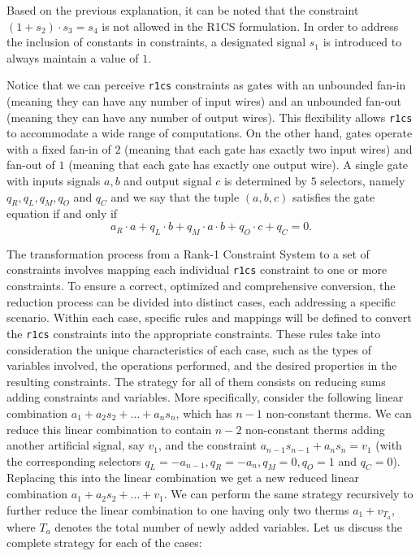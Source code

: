 Based on the previous explanation, it can be noted that the constraint $(1 + s_2) \cdot s_3 = s_4$ is not allowed in the R1CS formulation. In order to address the inclusion of constants in constraints, a designated signal $s_1$ is introduced to always maintain a value of $1$.

Notice that we can perceive \texttt{r1cs} constraints as gates with an unbounded fan-in (meaning they can have any number of input wires) and an unbounded fan-out (meaning they can have any number of output wires). This flexibility allows \texttt{r1cs} to accommodate a wide range of computations. On the other hand, \plonk gates operate with a fixed fan-in of $2$ (meaning that each gate has exactly two input wires) and fan-out of $1$ (meaning that each gate has exactly one output wire). A single \plonk gate with inputs signals $a, b$ and output signal $c$ is determined by $5$ selectors, namely $q_R, q_L, q_M, q_O$ and $q_C$ and we say that the tuple $(a, b, c)$ satisfies the gate equation if and only if
\[
a_R \cdot a + q_L \cdot b + q_M \cdot a \cdot b + q_O \cdot c + q_C = 0.
\]

The transformation process from a Rank-1 Constraint System to a set of \plonk constraints involves mapping each individual \texttt{r1cs} constraint to one or more \plonk constraints. To ensure a correct, optimized and comprehensive conversion, the reduction process can be divided into distinct cases, each addressing a specific scenario. Within each case, specific rules and mappings will be defined to convert the \texttt{r1cs} constraints into the appropriate \plonk constraints. These rules take into consideration the unique characteristics of each case, such as the types of variables involved, the operations performed, and the desired properties in the resulting \plonk constraints. The strategy for all of them consists on reducing sums adding constraints and variables. More specifically, consider the following linear combination $a_1 + a_2 s_2 + \dots + a_n s_n$, which has $n-1$ non-constant therms. We can reduce this linear combination to contain $n-2$ non-constant therms adding another artificial signal, say $v_1$, and the constraint $a_{n-1} s_{n-1} + a_n s_n = v_1$ (with the corresponding \plonk selectors $q_L = - a_{n-1}, q_R = - a_n, q_M = 0, q_O = 1$ and $q_C = 0$). Replacing this into the linear combination we get a new reduced linear combination $a_1 + a_2 s_2 + \dots + v_1$. We can perform the same strategy recursively to further reduce the linear combination to one having only two therms $a_1 + v_{T_a}$, where $T_a$ denotes the total number of newly added variables. Let us discuss the complete strategy for each of the cases:

